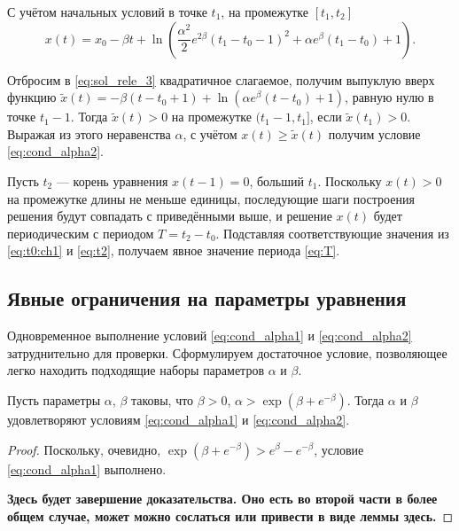 С учётом начальных условий в точке $t_1$, на промежутке $[t_1, t_2]$
\begin{equation}
\label{eq:sol_rele_3}
    x(t) = x_0-\beta t+\ln\left(\frac{\alpha^2}{2}e^{2\beta}(t_1-t_0-1)^2+\alpha e^{\beta}(t_1-t_0)+1\right).
\end{equation}

Отбросим в \eqref{eq:sol_rele_3} квадратичное слагаемое, получим выпуклую вверх функцию $\tilde{x}(t) = -\beta(t - t_0 + 1) + \ln(\alpha e^{\beta} (t - t_0) + 1)$, равную нулю в точке $t_1 - 1$. Тогда $\tilde{x}(t) > 0$ на промежутке $(t_1 - 1, t_1]$, если $\tilde{x}(t_1) > 0$. Выражая из этого неравенства $\alpha$, с учётом $x(t) \geqslant \tilde{x}(t)$ получим условие \eqref{eq:cond_alpha2}.

Пусть $t_2$ --- корень уравнения $x(t - 1) = 0$, больший $t_1$. Поскольку $x(t) > 0$ на промежутке длины не меньше единицы, последующие шаги построения решения будут совпадать с приведёнными выше, и решение $x(t)$ будет периодическим с периодом $T = t_2 - t_0$. Подставляя соответствующие значения из \eqref{eq:t0:ch1} и \eqref{eq:t2}, получаем явное значение периода \eqref{eq:T}.


\subsection{Явные ограничения на параметры уравнения}

Одновременное выполнение условий \eqref{eq:cond_alpha1} и \eqref{eq:cond_alpha2} затруднительно для проверки. Сформулируем достаточное условие, позволяющее легко находить подходящие наборы параметров $\alpha$ и $\beta$.

\begin{theorem}
Пусть параметры $\alpha$, $\beta$ таковы, что $\beta > 0$, $\alpha > \exp(\beta + e^{-\beta})$. Тогда $\alpha$ и $\beta$ удовлетворяют условиям \eqref{eq:cond_alpha1} и \eqref{eq:cond_alpha2}.
\end{theorem}
\begin{proof}
	Поскольку, очевидно, $\exp(\beta + e^{-\beta}) > e^{\beta} - e^{-\beta}$, условие \eqref{eq:cond_alpha1} выполнено.	
	
	\textbf{Здесь будет завершение доказательства. Оно есть во второй части в более общем случае, может можно сослаться или привести в виде леммы здесь.}
	
	
\end{proof}

